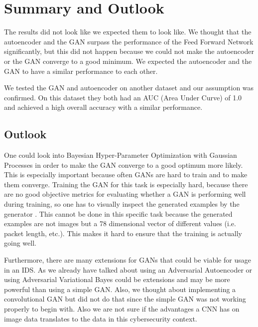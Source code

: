 \documentclass[]{article}
\begin{document}
	\section{Summary and Outlook}
	The results did not look like we expected them to look like. We thought that the autoencoder and the GAN surpass the performance of the Feed Forward Network significantly, but this did not happen because we could not make the autoencoder or the GAN converge to a good minimum. We expected the autoencoder and the GAN to have a similar performance to each other. 
	
	We tested the GAN and autoencoder on another dataset and our assumption was confirmed. On this dataset they both had an AUC (Area Under Curve) of 1.0 and achieved a high overall accuracy with a similar performance. 
	
	\subsection{Outlook}
	\noindent
	One could look into Bayesian Hyper-Parameter Optimization with Gaussian Processes in order to make the GAN converge to a good optimum more likely. This is especially important because often GANs are hard to train and to make them converge. Training the GAN for this task is especially hard, because there are no good objective metrics for evaluating whether a GAN is performing well during training, so one has to visually inspect the generated examples by the generator \cite{https://doi.org/10.48550/arxiv.1606.03498}. This cannot be done in this specific task because the generated examples are not images but a 78 dimensional vector of different values (i.e. packet length, etc.). This makes it hard to ensure that the training is actually going well. 
	\newline
	
	\noindent
	Furthermore, there are many extensions for GANs that could be viable for usage in an IDS. As we already have talked about using an Adversarial Autoencoder or using Adversarial Variational Bayes could be extensions and may be more powerful than using a simple GAN. Also, we thought about implementing a convolutional GAN but did not do that since the simple GAN was not working properly to begin with. Also we are not sure if the advantages a CNN has on image data translates to the data in this cybersecurity context. 
	\newpage

	
	
\end{document}
